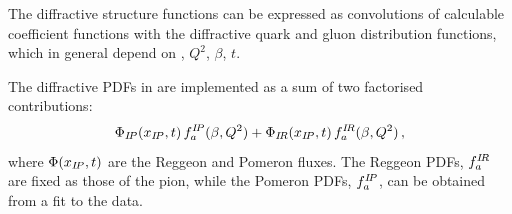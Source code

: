 The diffractive structure functions can be expressed as convolutions of 
calculable coefficient functions with the diffractive quark and gluon distribution functions,
 which in general depend on \xpom, $Q^2$, $\beta$, $t$.

The diffractive PDFs \cite{Aktas:2006hy, zeus:diff2009} in \fitter are implemented as a sum 
of two factorised contributions:
\begin{equation}
 \Phi_{I\!P}(x_{I\!P},t)\, f^{{I\!P}}_{a}(\beta,Q^2)
  + 
 \Phi_{I\!R}(x_{I\!P},t)\, f^{{I\!R}}_{a}(\beta,Q^2)
 \,,
\end{equation} 
where $\Phi(x_{I\!P},t)$ are the Reggeon and Pomeron fluxes.
The Reggeon PDFs, $f^{{I\!R}}_{a}$ are fixed as those of the pion, while the Pomeron PDFs,
$f^{{I\!P}}_{a}$, can be obtained from a fit to the data.

